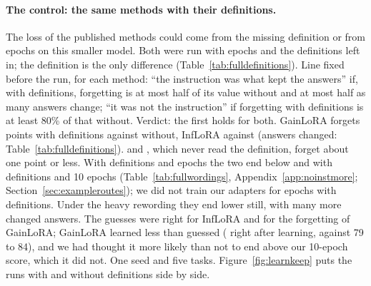 \paragraph{The control: the same methods with their definitions.} The loss of the published methods could come from the missing definition or from \AudFullEpochs{} epochs on this smaller model. Both were run with \AudFullEpochs{} epochs and the definitions left in; the definition is the only difference (Table~\ref{tab:fulldefinitions}).
Line fixed before the run, for each method: ``the instruction was what kept the answers'' if, with definitions, forgetting is at most half of its value without and at most half as many answers change; ``it was not the instruction'' if forgetting with definitions is at least 80\% of that without. Verdict: the first holds for both. GainLoRA forgets \AudFullDefOriginalGainloraFT{} points with definitions against \AudFullGainloraFT{} without, InfLoRA \AudFullDefOriginalInfloraFT{} against \AudFullInfloraFT{} (answers changed: Table~\ref{tab:fulldefinitions}). \recog{} and \handicap{}, which never read the definition, forget about one point or less.
With definitions and \AudFullEpochs{} epochs the two end below \cert{} and \recog{} with definitions and 10 epochs (Table~\ref{tab:fullwordings}, Appendix~\ref{app:noinstmore}; Section~\ref{sec:exampleroutes}); we did not train our adapters for \AudFullEpochs{} epochs with definitions. Under the heavy rewording they end lower still, with many more changed answers.
The guesses were right for InfLoRA and for the forgetting of GainLoRA; GainLoRA learned less than guessed (\AudFullDefOriginalGainloraLearned{} right after learning, against 79 to 84), and we had thought it more likely than not to end above our 10-epoch score, which it did not. One seed and five tasks. Figure~\ref{fig:learnkeep} puts the runs with and without definitions side by side.



\begin{table}[t]
  \caption{The definition as the only difference: the two published methods with \AudFullEpochs{} epochs per task, with and without definitions (five tasks, seed 42, re-test), and \recog{} and \handicap{} without definitions at the same epochs.}
  \label{tab:fulldefinitions}
  \centering
  
\end{table}

\begin{table}[t]
  \caption{The five tasks without definitions, seed 42, re-test: plain adapters behind \recog{} and \handicap{} and the two published methods, each with \AudFullEpochs{} epochs per task (the published number) and with 10. Columns as in Table~\ref{tab:noinstpublished}.}
  \label{tab:noinstfull}
  \centering
  
\end{table}

